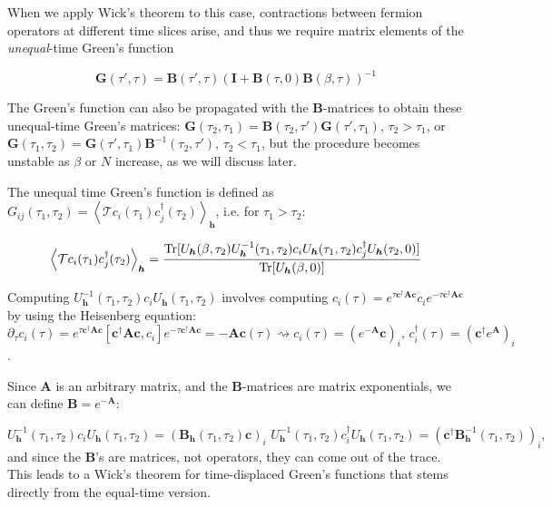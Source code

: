 When we apply Wick's theorem to this case, contractions between fermion operators at different time slices arise, and thus we require matrix elements of the \emph{unequal}-time Green's function

\begin{equation}
\bm G ( \tau' , \tau ) = \bm B ( \tau', \tau ) ( \bm I + \bm B ( \tau, 0 ) \bm B ( \beta, \tau ) )^{-1}
\end{equation}

The Green's function can also be propagated with the $\bm B$-matrices to obtain these unequal-time Green's matrices: $\bm G ( \tau_2, \tau_1) = \bm B ( \tau_2, \tau') \bm G ( \tau', \tau_1)$, $\tau_2 > \tau_1$, or $\bm G ( \tau_1, \tau_2) =  \bm G ( \tau', \tau_1) \bm B^{-1} ( \tau_2, \tau') , \, \tau_2 < \tau_1$, but the procedure becomes unstable as $\beta$ or $N$ increase, as we will discuss later.

The unequal time Green's function is defined as 
$
G_{ij} ( \tau_1, \tau_2 ) = \left\langle \mathcal{T} c_i ( \tau_1 ) c_j^\dagger ( \tau_2 ) \right\rangle_{\bm h}
$, 
i.e. for $\tau_1 > \tau_2$:

\begin{equation}
\left\langle \mathcal{T} c_i ( \tau_1 ) c_j^\dagger ( \tau_2 ) \right\rangle_{\bm h} = \frac{\operatorname{Tr} [ U_{\bm h} (\beta, \tau_2 ) U_{\bm h}^{-1} (\tau_1, \tau_2) c_i U_{\bm h} (\tau_1, \tau_2 ) c_j^\dagger U_{\bm h} (\tau_2, 0) ]}{\operatorname{Tr}[ U_{\bm h}(\beta, 0) ]}
\end{equation}

Computing $U_{\bm h}^{-1} (\tau_1, \tau_2) c_i U_{\bm h} (\tau_1, \tau_2 )$ involves computing $c_i ( \tau ) = e^{\tau \bm c^\dagger \bm A \bm c} c_i e^{-\tau \bm c^\dagger \bm A \bm c}$ by using the Heisenberg equation:
$
\partial_\tau c_i ( \tau ) = e^{\tau \bm c^\dagger \bm A \bm c} [ \bm c^\dagger \bm A \bm c, c_i ] e^{-\tau \bm c^\dagger \bm A \bm c} = - \bm A \bm c ( \tau ) \rightsquigarrow c_i (\tau ) = ( e^{-\bm A} \bm c )_i , \, c_i ^\dagger(\tau ) = ( \bm c^\dagger e^{\bm A}  )_i 
$.

Since $\bm A$ is an arbitrary matrix, and the $\bm B$-matrices are matrix exponentials, we can define $\bm B = e^{-\bm A}$:

\begin{equation}
U_{\bm h}^{-1} (\tau_1, \tau_2) c_i U_{\bm h} (\tau_1, \tau_2 ) = ( \bm B_{\bm h} ( \tau_1 , \tau_2 ) \bm c )_i \,\,
U_{\bm h}^{-1} (\tau_1, \tau_2) c_i^\dagger U_{\bm h} (\tau_1, \tau_2 ) = ( \bm c^\dagger \bm B_{\bm h}^{-1} ( \tau_1 , \tau_2 )  )_i ,
\end{equation}
and since the $\bm B$'s are matrices, not operators, they can come out of the trace.
This leads to a Wick's theorem for time-displaced Green's functions that stems directly from the equal-time version.


